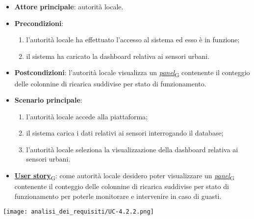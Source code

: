 \begin{itemize}
	\item \textbf{Attore principale}: autorità locale.
	\item \textbf{Precondizioni}:
	      \begin{enumerate}
		      \item l'autorità locale ha effettuato l'accesso al sistema ed esso è in funzione;
		      \item il sistema ha caricato la dashboard relativa ai sensori urbani.
	      \end{enumerate}
	\item \textbf{Postcondizioni}: l'autorità locale visualizza un \href{https://7last.github.io/docs/pb/documentazione-interna/glossario\#panel}{\textit{panel}\textsubscript{G}} contenente il conteggio delle colonnine di ricarica suddivise per stato di funzionamento.
	\item \textbf{Scenario principale}:
	      \begin{enumerate}
		      \item l'autorità locale accede alla piattaforma;
		      \item il sistema carica i dati relativi ai sensori interrogando il database;
		      \item l'autorità locale seleziona la visualizzazione della dashboard relativa ai sensori urbani.
	      \end{enumerate}
	\item \href{https://7last.github.io/docs/pb/documentazione-interna/glossario\#user-story}{\textbf{User story}\textsubscript{G}}:
	      come autorità locale desidero poter visualizzare un \href{https://7last.github.io/docs/pb/documentazione-interna/glossario\#panel}{\textit{panel}\textsubscript{G}} contenente il conteggio delle colonnine di ricarica suddivise per stato di funzionamento
	      per poterle monitorare e intervenire in caso di guasti.
\end{itemize}
\begin{center}
	\texttt{[image: analisi\_dei\_requisiti/UC-4.2.2.png]}
\end{center}


